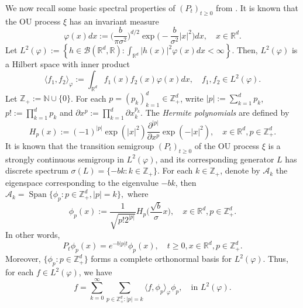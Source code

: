 \documentclass[12pt,a4paper]{amsart}
\theoremstyle{plain}
\theoremstyle{definition}
\numberwithin{equation}{section}
\begin{document}
    We now recall some basic spectral properties of $(P_t)_{t\geq 0}$ from \cite{MetafunePallaraPriola2002Spectrum}.
        It is known that the OU process $\xi$ has an invariant measure
\begin{equation}
\label{invariantdensity}
    \varphi(x)dx
    :=\Big (\frac{b}{\pi \sigma^2}\Big )^{d/2}\exp \Big(-\frac{b}{\sigma^2}|x|^2 \Big)dx,
    \quad x\in \mathbb R^d.
\end{equation}
    Let $L^2(\varphi):= \left\{ h  \in \mathcal B(\mathbb R^d, \mathbb R): \int_{\mathbb R^d} |h(x)|^2 \varphi(x) dx < \infty \right\}$.
        Then, $L^2(\varphi)$ is a Hilbert space with inner product
\begin{equation}
    \langle f_1, f_2 \rangle_{\varphi}
    := \int_{\mathbb R^d}f_1(x)f_2(x)\varphi(x) dx, \quad f_1,f_2 \in L^2(\varphi).
\end{equation}
       Let $\mathbb Z_+ := \mathbb N\cup\{0\}$.
    For each $p = (p_k)_{k = 1}^d \in \mathbb{Z}_+^{d}$, write $|p|:=\sum_{k=1}^d p_k$, $p!:= \prod_{k= 1}^d p_k$ and $\partial x^p:= \prod_{k = 1}^d\partial x_k^{p_k}$.
    The \emph{Hermite polynomials} are defined by
\begin{equation}
    H_p(x)
    :=(-1)^{|p|}\exp(|x|^2) \frac{\partial ^{|p|}}{\partial x^p} \exp(-|x|^2) ,
    \quad x\in \mathbb R^d,
    p \in \mathbb{Z}_+^{d}.
\end{equation}
       It is known that the transition semigroup $(P_t)_{t\geq 0}$ of the OU process $\xi$ is a strongly continuous semigroup in $L^2(\varphi)$, and its corresponding generator $L$ has discrete spectrum
        $\sigma(L)= \{-bk: k \in \mathbb Z_+\}$.
    For each $k \in \mathbb Z_+$, denote by $\mathcal{A}_k$ the eigenspace corresponding to the eigenvalue $-bk$, then
$
    \mathcal{A}_k
    = \operatorname{Span} \{\phi_p : p\in \mathbb Z_+^d, |p|=k\},
$
    where
\begin{equation}\label{eigenfunction}
    \phi_p(x)
        := \frac{1}{\sqrt{ p! 2^{|p|} }} H_p \Big(\frac{ \sqrt{b} }{\sigma}x \Big),
    \quad x\in \mathbb R^d, p\in \mathbb Z_+^d.
\end{equation}
       In other words,
\begin{equation}
    P_t\phi_p(x)
    =e^{-b|p|t}\phi_p(x),
    \quad t\geq 0, x\in \mathbb R^d, p\in \mathbb Z_+^d.
\end{equation}
    Moreover, $\{\phi_p: p \in \mathbb Z_+^d\}$ forms a complete orthonormal basis for $L^2(\varphi)$.
    Thus, for each $f\in L^2(\varphi)$, we have
\begin{equation}\label{semicomp1}
    f
         =\sum_{k=0}^{\infty}\sum_{p\in \mathbb Z_+^d:|p|=k}\langle f, \phi_p \rangle_{\varphi} \phi_p,
    \quad \text{in~} L^2(\varphi).
\end{equation}
\end{document}

